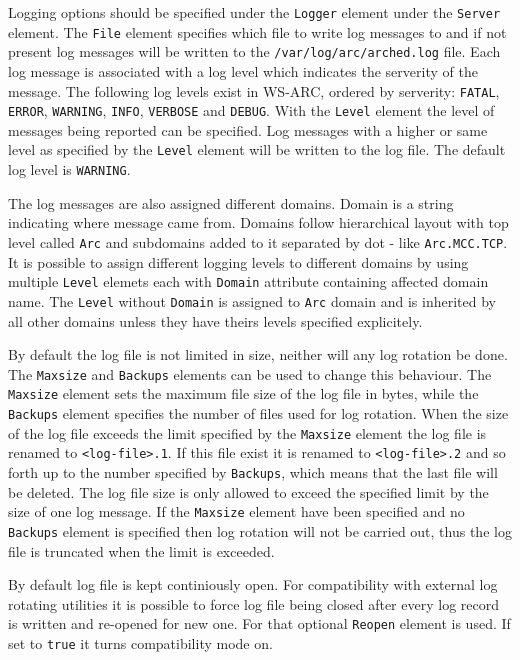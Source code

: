 \documentclass{article}
\begin{document}
Logging options should be specified under the \texttt{Logger} element under the
\texttt{Server} element. The \texttt{File} element specifies which file to write
log messages to and if not present log messages will be written to the
\texttt{/var/log/arc/arched.log} file. Each log message is associated with a log
level which indicates the serverity of the message. The following log levels
exist in WS-ARC, ordered by serverity: \texttt{FATAL}, \texttt{ERROR},
\texttt{WARNING}, \texttt{INFO}, \texttt{VERBOSE} and \texttt{DEBUG}. With
the \texttt{Level} element the level of messages being reported can be
specified. Log messages with a higher or same level as specified by the
\texttt{Level} element will be written to the log file. The default log level is
\texttt{WARNING}.

The log messages are also assigned different domains. Domain is a string
indicating where message came from. Domains follow hierarchical layout with
top level called \texttt{Arc} and subdomains added to it separated by dot -
like \texttt{Arc.MCC.TCP}. It is possible to assign different logging levels
to different domains by using multiple \texttt{Level} elemets each with
\texttt{Domain} attribute containing affected domain name. The \texttt{Level}
without \texttt{Domain} is assigned to \texttt{Arc} domain and is inherited
by all other domains unless they have theirs levels specified explicitely.

By default the log file is not limited in size, neither
will any log rotation be done. The \texttt{Maxsize} and \texttt{Backups}
elements can be used to change this behaviour. The \texttt{Maxsize} element sets
the maximum file size of the log file in bytes, while the \texttt{Backups}
element specifies the number of files used for log rotation. When the size of
the log file exceeds the limit specified by the \texttt{Maxsize} element the log
file is renamed to \texttt{<log-file>.1}. If this file exist it is renamed to
\texttt{<log-file>.2} and so forth up to the number specified by
\texttt{Backups}, which means that the last file will be deleted. The log file
size is only allowed to exceed the specified limit by the size of one log
message. If the \texttt{Maxsize} element have been specified and no
\texttt{Backups} element is specified then log rotation will not be carried out,
thus the log file is truncated when the limit is exceeded.

By default log file is kept continiously open. For compatibility with external
log rotating utilities it is possible to force log file being closed after
every log record is written and re-opened for new one. For that optional
\texttt{Reopen} element is used. If set to \texttt{true} it turns compatibility
mode on.
\end{document}
